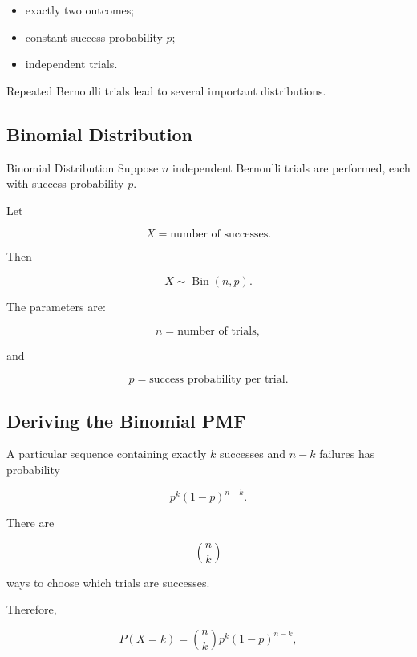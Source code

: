 \begin{itemize}
    \item exactly two outcomes;
    \item constant success probability \(p\);
    \item independent trials.
\end{itemize}

Repeated Bernoulli trials lead to several important distributions.

\subsection{Binomial Distribution}
\label{subsec:binomial-distribution}

\begin{definitionbox}{Binomial Distribution}
Suppose \(n\) independent Bernoulli trials are performed, each with
success probability \(p\).

Let

\[
X
=
\text{number of successes}.
\]

Then

\[
\boxed{
X\sim\operatorname{Bin}(n,p).
}
\]
\end{definitionbox}

The parameters are:

\[
n
=
\text{number of trials},
\]

and

\[
p
=
\text{success probability per trial}.
\]

\subsection{Deriving the Binomial PMF}
\label{subsec:derive-binomial-pmf}

A particular sequence containing exactly \(k\) successes and
\(n-k\) failures has probability

\[
p^k(1-p)^{n-k}.
\]

There are

\[
\binom nk
\]

ways to choose which trials are successes.

Therefore,

\[
\boxed{
P(X=k)
=
\binom nk
p^k(1-p)^{n-k},
}
\]

